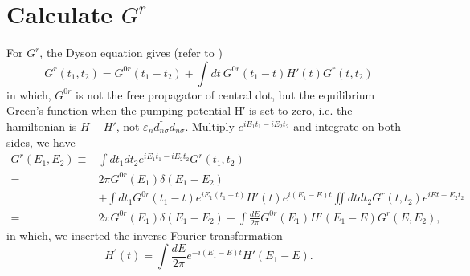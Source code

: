 \documentclass[11pt,a4paper]{article}
\begin{document}
\section{Calculate $G^{r}$}
For $G^{r}$, the Dyson equation gives (refer to \cite{Baigeng})
\begin{equation}
G^{r}(t_{1},t_{2})=G^{0r}(t_{1}-t_{2})+\int dt ~G^{0r}(t_{1}-t) H'(t) G^{r}(t,t_{2})
\label{eq:dyson-2}
\end{equation}
in which, $G^{0r}$ is not the free propagator of central dot, but the equilibrium Green’s function when the pumping potential H′ is set to zero, i.e. the hamiltonian is $H-H'$, not $\varepsilon_{n}d_{n\sigma}^{\dag}d_{n\sigma}$. Multiply $e^{i E_{1} t_{1}-i E_{2} t_{2}}$ and integrate on both sides, we have
\begin{equation}
\begin{split}
G^{r}(E_{1}, E_{2})\equiv& \int d t_{1} d t_{2} e^{i E_{1} t_{1}-i E_{2} t_{2}} G^{r}(t_{1}, t_{2}) \\
=& 2\pi G^{0r}(E_{1})\delta(E_{1}-E_{2}) \\
&+ \int dt_{1}G^{0r}(t_{1}-t) e^{iE_{1}(t_{1}-t)} H'(t) e^{i(E_{1}-E)t} \iint dtdt_{2} G^{r}(t,t_{2}) e^{iEt-E_{2}t_{2}} \\
=& 2\pi G^{0r}(E_{1})\delta(E_{1}-E_{2}) + \int \frac{dE}{2\pi}G^{0r}(E_{1}) H'(E_{1}-E) G^{r}(E,E_{2}),
\end{split}
\label{eq:Gr}
\end{equation}
in which, we inserted the inverse Fourier transformation
\begin{equation}
H^{\prime}(t) = \int \frac{dE}{2\pi} e^{-i(E_{1}-E)t} H'(E_{1}-E).
\end{equation}
\end{document}
